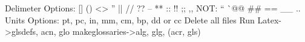 {{{{{{{{{
Delimeter Options: {} [] () <> '' || // ?? -- ** :: !! ;; ,, NOT: `` ^^ @@ ## == __ ..
Units Options: pt, pc, in, mm, cm, bp, dd or cc
Delete all files
Run Latex->glsdefs, acn, glo
makeglossaries->alg, glg, (acr, gls)
}}}}}}}}}
